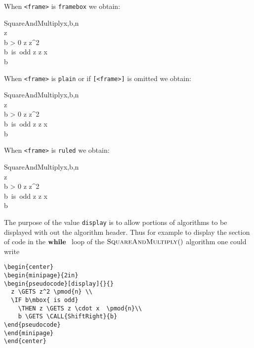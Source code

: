 \documentclass{article}
\begin{document}
\noindent When \verb+<frame>+ is \verb+framebox+ we obtain:

\begin{pseudocode}[framebox]{SquareAndMultiply}{x,b,n}
 \\
 z\\
 \WHILE b > 0 \DO
 \BEGIN
  z \GETS z^2  \\
  \IF b\mbox{ is odd} 
    \THEN z \GETS z \cdot x   \\
    b \GETS {}
 \END\\
\end{pseudocode}

\noindent When \verb+<frame>+ is \verb+plain+ or if \verb+[<frame>]+ is omitted we obtain:

\begin{pseudocode}[plain]{SquareAndMultiply}{x,b,n}
 \\
 z\\
 \WHILE b > 0 \DO
 \BEGIN
  z \GETS z^2  \\
  \IF b\mbox{ is odd} 
    \THEN z \GETS z \cdot x   \\
    b \GETS {}
 \END\\
\end{pseudocode}

\noindent When \verb+<frame>+ is \verb+ruled+ we obtain:

\begin{pseudocode}[ruled]{SquareAndMultiply}{x,b,n}
 \\
 z\\
 \WHILE b > 0 \DO
 \BEGIN
  z \GETS z^2  \\
  \IF b\mbox{ is odd} 
    \THEN z \GETS z \cdot x   \\
    b \GETS {}
 \END\\
\end{pseudocode}


The purpose of the value \verb+display+ is to allow portions of
algorithms to be displayed with out the algorithm header. Thus
for example to display the section of code in the $\mbox{\bfseries while }$ loop
of the $\mbox{\textsc{SquareAndMultiply}}()$ algorithm one could write

\begin{verbatim}
\begin{center}
\begin{minipage}{2in}
\begin{pseudocode}[display]{}{}
  z \GETS z^2 \pmod{n} \\
  \IF b\mbox{ is odd}
    \THEN z \GETS z \cdot x  \pmod{n}\\
    b \GETS \CALL{ShiftRight}{b}
\end{pseudocode}
\end{minipage}
\end{center}
\end{verbatim}
\end{document}
